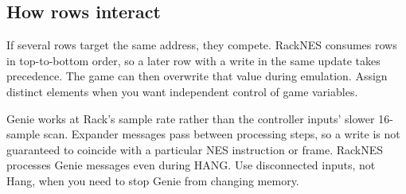 \subsection{How rows interact}
If several rows target the same address, they compete. RackNES consumes rows
in top-to-bottom order, so a later row with a write in the same update takes
precedence. The game can then overwrite that value during emulation.
Assign distinct elements when you want independent control of game variables.

Genie works at Rack's sample rate rather than the controller inputs' slower
16-sample scan. Expander messages pass between processing steps, so a write
is not guaranteed to coincide with a particular NES instruction or frame.
RackNES processes Genie messages even during HANG. Use disconnected inputs,
not Hang, when you need to stop Genie from changing memory.
